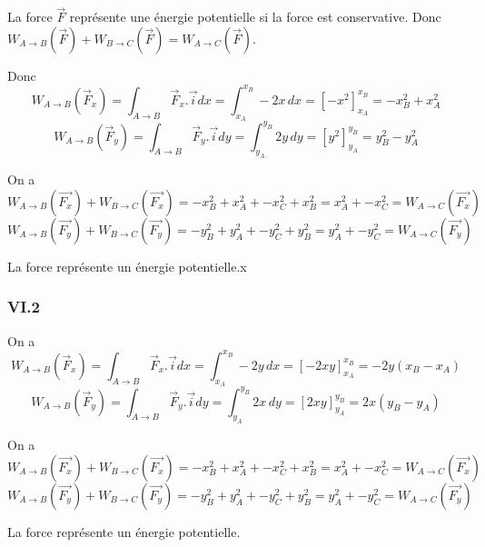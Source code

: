 \documentclass[]{book}
\theoremstyle{definition}
\begin{document}
La force $\vec{F}$ repr\'esente une \'energie potentielle si la force est conservative. Donc $W_{A \to B}(\vec{F}) + W_{B \to C}(\vec{F}) = W_{A \to C}(\vec{F})$.

Donc
$$W_{A \to B}(\vec{F}_x) = \int_{A \to B} \vec{F}_x.\vec{i}dx = \int_{x_A}^{x_B} -2x\,dx = [-x^2]_{x_A}^{x_B} = -x_B^2 + x_A^2$$
$$W_{A \to B}(\vec{F}_y) = \int_{A \to B} \vec{F}_y.\vec{i}dy = \int_{y_A}^{y_B} 2y\,dy = [y^2]_{y_A}^{y_B} = y_B^2 - y_A^2$$

On a
$$W_{A \to B}(\vec{F_x}) + W_{B \to C}(\vec{F_x}) = -x_B^2 + x_A^2 + -x_C^2 + x_B^2 = x_A^2 + -x_C^2 = W_{A \to C}(\vec{F_x})$$
$$W_{A \to B}(\vec{F_y}) + W_{B \to C}(\vec{F_y}) = -y_B^2 + y_A^2 + -y_C^2 + y_B^2 = y_A^2 + -y_C^2 = W_{A \to C}(\vec{F_y})$$

La force repr\'esente un \'energie potentielle.x

\subsubsection*{VI.2}

On a
$$W_{A \to B}(\vec{F}_x) = \int_{A \to B} \vec{F}_x.\vec{i}dx = \int_{x_A}^{x_B} -2y\,dx = [-2xy]_{x_A}^{x_B} = -2y(x_B - x_A)$$
$$W_{A \to B}(\vec{F}_y) = \int_{A \to B} \vec{F}_y.\vec{i}dy = \int_{y_A}^{y_B} 2x\,dy = [2xy]_{y_A}^{y_B} = 2x(y_B - y_A)$$

On a
$$W_{A \to B}(\vec{F_x}) + W_{B \to C}(\vec{F_x}) = -x_B^2 + x_A^2 + -x_C^2 + x_B^2 = x_A^2 + -x_C^2 = W_{A \to C}(\vec{F_x})$$
$$W_{A \to B}(\vec{F_y}) + W_{B \to C}(\vec{F_y}) = -y_B^2 + y_A^2 + -y_C^2 + y_B^2 = y_A^2 + -y_C^2 = W_{A \to C}(\vec{F_y})$$

La force repr\'esente un \'energie potentielle.
\end{document}
